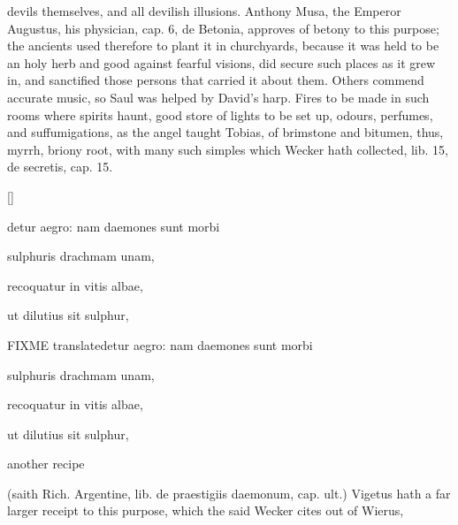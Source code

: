 {devils themselves, and all devilish illusions. Anthony Musa, the
Emperor Augustus, his physician, cap. 6, de Betonia, approves of betony
to this purpose; the ancients used therefore to plant it in
churchyards, because it was held to be an holy herb and good against
fearful visions, did secure such places as it grew in, and sanctified
those persons that carried it about them.  Others commend accurate music, so Saul was helped by
David's harp. Fires to be made in such rooms where spirits haunt, good
store of lights to be set up, odours, perfumes, and suffumigations, as
the angel taught Tobias, of brimstone and bitumen, thus, myrrh, briony
root, with many such simples which Wecker hath collected, lib. 15, de
secretis, cap. 15.

\begin{Prescription}[H]
[\baselineskip]
\begin{prescriptionbox}{}{\textlatin{detur aegro: nam daemones sunt morbi}}
\item \textlatin{sulphuris drachmam unam},
\item \textlatin{recoquatur in vitis albae},
\item \textlatin{ut dilutius sit sulphur},
\end{prescriptionbox}
\begin{prescriptionbox}{FIXME translate}{\textlatin{detur aegro: nam daemones sunt morbi}}
\item \textlatin{sulphuris drachmam unam},
\item \textlatin{recoquatur in vitis albae},
\item \textlatin{ut dilutius sit sulphur},
\end{prescriptionbox}
\caption{another recipe}
\end{Prescription}

(saith Rich. Argentine, \textlatin{lib. de praestigiis daemonum, cap. ult.})
Vigetus hath a far larger receipt to this purpose, which the said
Wecker cites out of Wierus,

}
